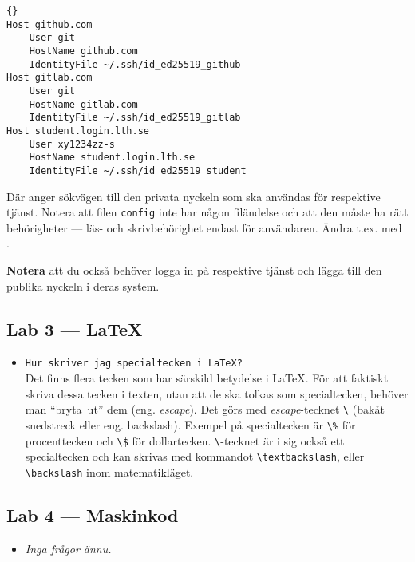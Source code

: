 \documentclass[fleqn, article, a4paper]{memoir}
\newcommand{\file}[1]{\texttt{#1}}
\begin{document}
\begin{itemize}
	      \begin{lstlisting}{}
Host github.com
    User git
	HostName github.com
	IdentityFile ~/.ssh/id_ed25519_github
Host gitlab.com
	User git
	HostName gitlab.com
	IdentityFile ~/.ssh/id_ed25519_gitlab
Host student.login.lth.se
    User xy1234zz-s
	HostName student.login.lth.se
	IdentityFile ~/.ssh/id_ed25519_student
	      \end{lstlisting}
	      Där  anger sökvägen till den privata nyckeln som ska användas för respektive tjänst. Notera att filen \file{config} inte har någon filändelse och att den måste ha rätt behörigheter --- läs- och skrivbehörighet endast för användaren. Ändra t.ex. med .

	      \textbf{Notera} att du också behöver logga in på respektive tjänst och lägga till den publika nyckeln i deras system.
\end{itemize}

\subsection{Lab 3 --- \LaTeX}

\begin{itemize}
	\item \texttt{Hur skriver jag specialtecken i \LaTeX{}?}\\
	      Det finns flera tecken som har särskild betydelse i \LaTeX{}. För att faktiskt skriva dessa tecken i texten, utan att de ska tolkas som specialtecken, behöver man ``bryta~ut'' dem (eng. \emph{escape}). Det görs med \emph{escape}-tecknet \texttt{\textbackslash} (bakåt snedstreck eller eng. backslash). Exempel på specialtecken är \texttt{\textbackslash\%} för procenttecken och \texttt{\textbackslash\$} för dollartecken. \texttt{\textbackslash}-tecknet är i sig också ett specialtecken och kan skrivas med kommandot \texttt{\textbackslash{textbackslash}}, eller \texttt{\textbackslash{backslash}} inom matematikläget.

\end{itemize}

\subsection{Lab 4 --- Maskinkod}
\begin{itemize}
	\item \emph{Inga frågor ännu.}
\end{itemize}
\end{document}
